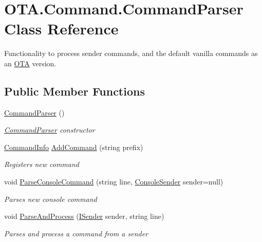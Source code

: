 \hypertarget{class_o_t_a_1_1_command_1_1_command_parser}{}\section{O\+T\+A.\+Command.\+Command\+Parser Class Reference}
\label{class_o_t_a_1_1_command_1_1_command_parser}


Functionality to process sender commands, and the default vanilla commands as an \hyperlink{namespace_o_t_a}{O\+T\+A} version.  


\subsection*{Public Member Functions}
\begin{DoxyCompactItemize}
\item 
\hyperlink{class_o_t_a_1_1_command_1_1_command_parser_aea6003bc590439b5a6310d2fc035d4cf}{Command\+Parser} ()
\begin{DoxyCompactList}\small\item\em \hyperlink{class_o_t_a_1_1_command_1_1_command_parser}{Command\+Parser} constructor \end{DoxyCompactList}\item 
\hyperlink{class_o_t_a_1_1_command_1_1_command_info}{Command\+Info} \hyperlink{class_o_t_a_1_1_command_1_1_command_parser_ae2933dd42917805ec634ec27c81136be}{Add\+Command} (string prefix)
\begin{DoxyCompactList}\small\item\em Registers new command \end{DoxyCompactList}\item 
void \hyperlink{class_o_t_a_1_1_command_1_1_command_parser_af2336b11ff1086dcd1bed95cc8574be5}{Parse\+Console\+Command} (string line, \hyperlink{class_o_t_a_1_1_command_1_1_console_sender}{Console\+Sender} sender=null)
\begin{DoxyCompactList}\small\item\em Parses new console command \end{DoxyCompactList}\item 
void \hyperlink{class_o_t_a_1_1_command_1_1_command_parser_a0c951128a9e5d6259c0f2b69dd934331}{Parse\+And\+Process} (\hyperlink{interface_o_t_a_1_1_command_1_1_i_sender}{I\+Sender} sender, string line)
\begin{DoxyCompactList}\small\item\em Parses and process a command from a sender \end{DoxyCompactList}\end{DoxyCompactItemize}
